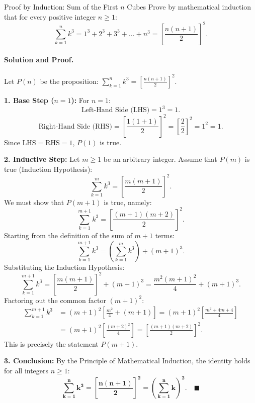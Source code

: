 \begin{workedexample}{Proof by Induction: Sum of the First $n$ Cubes}
Prove by mathematical induction that for every positive integer $n \ge 1$:
\[
\sum_{k=1}^n k^3 = 1^3 + 2^3 + 3^3 + \dots + n^3 = \left[ \frac{n(n+1)}{2} \right]^2.
\]

\paragraph{Solution and Proof.}
Let $P(n)$ be the proposition: $\sum_{k=1}^n k^3 = \left[ \frac{n(n+1)}{2} \right]^2$.

\textbf{1. Base Step ($n = 1$):}
For $n = 1$:
\[
\text{Left-Hand Side (LHS)} = 1^3 = 1.
\]
\[
\text{Right-Hand Side (RHS)} = \left[ \frac{1(1+1)}{2} \right]^2 = \left[ \frac{2}{2} \right]^2 = 1^2 = 1.
\]
Since $\mathrm{LHS} = \mathrm{RHS} = 1$, $P(1)$ is true.

\textbf{2. Inductive Step:}
Let $m \ge 1$ be an arbitrary integer. Assume that $P(m)$ is true (Induction Hypothesis):
\[
\sum_{k=1}^m k^3 = \left[ \frac{m(m+1)}{2} \right]^2.
\]
We must show that $P(m+1)$ is true, namely:
\[
\sum_{k=1}^{m+1} k^3 = \left[ \frac{(m+1)(m+2)}{2} \right]^2.
\]
Starting from the definition of the sum of $m+1$ terms:
\[
\sum_{k=1}^{m+1} k^3 = \left( \sum_{k=1}^m k^3 \right) + (m+1)^3.
\]
Substituting the Induction Hypothesis:
\[
\sum_{k=1}^{m+1} k^3 = \left[ \frac{m(m+1)}{2} \right]^2 + (m+1)^3 = \frac{m^2 (m+1)^2}{4} + (m+1)^3.
\]
Factoring out the common factor $(m+1)^2$:
\begin{align*}
\sum_{k=1}^{m+1} k^3 &= (m+1)^2 \left[ \frac{m^2}{4} + (m+1) \right] = (m+1)^2 \left[ \frac{m^2 + 4m + 4}{4} \right] \\
                    &= (m+1)^2 \left[ \frac{(m+2)^2}{4} \right] = \left[ \frac{(m+1)(m+2)}{2} \right]^2.
\end{align*}
This is precisely the statement $P(m+1)$.

\textbf{3. Conclusion:}
By the Principle of Mathematical Induction, the identity holds for all integers $n \ge 1$:
\[
\mathbf{\sum_{k=1}^n k^3 = \left[ \frac{n(n+1)}{2} \right]^2 = \left( \sum_{k=1}^n k \right)^2}. \quad \blacksquare
\]
\end{workedexample}

